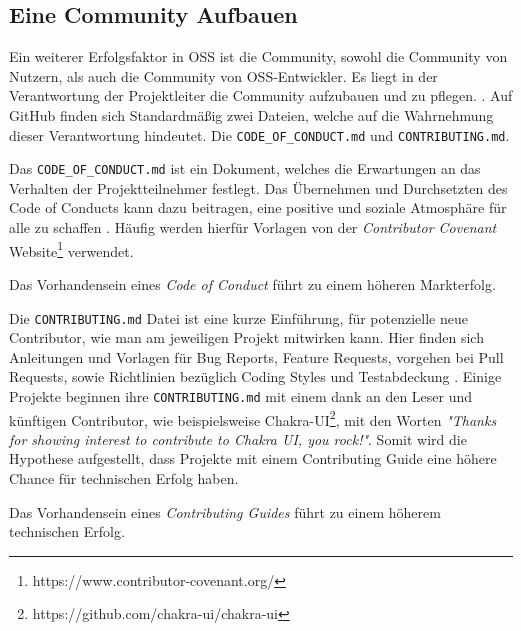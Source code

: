 \subsection{Eine Community Aufbauen} \label{ssec:Eine Community Aufbauen}


Ein weiterer Erfolgsfaktor in OSS ist die Community, sowohl die Community von Nutzern, als auch die
Community von OSS-Entwickler. Es liegt in der Verantwortung der Projektleiter die Community aufzubauen
und zu pflegen. \cite{bangerthWhatMakesComputational2013,GitHubBuildingWelcomingCommunities2022}.
Auf GitHub finden sich Standardmäßig zwei Dateien, welche auf die Wahrnehmung dieser Verantwortung
hindeutet. Die \texttt{CODE\_OF\_CONDUCT.md} und \texttt{CONTRIBUTING.md}.

\bigskip

Das \texttt{CODE\_OF\_CONDUCT.md} ist ein Dokument, welches die Erwartungen an das Verhalten der
Projektteilnehmer festlegt.
Das Übernehmen und Durchsetzten des Code of Conducts kann dazu beitragen, eine positive und soziale
Atmosphäre für alle zu schaffen \cite{GitHubYourCodeOfConduct2022}. %
Häufig werden hierfür Vorlagen von der \textit{Contributor Covenant} 
Website\footnote{https://www.contributor-covenant.org/} verwendet.

\begin{hypothesis}
    Das Vorhandensein eines \textit{Code of Conduct} führt zu einem höheren Markterfolg.
\end{hypothesis}

Die \texttt{CONTRIBUTING.md} Datei ist eine kurze Einführung, für potenzielle neue Contributor,
wie man am jeweiligen Projekt mitwirken kann. Hier finden sich Anleitungen und Vorlagen für 
Bug Reports, Feature Requests, vorgehen bei Pull Requests, sowie Richtlinien bezüglich 
Coding Styles und Testabdeckung \cite{GitHubStartingAProject2022}. %
Einige Projekte beginnen ihre \texttt{CONTRIBUTING.md} mit einem dank an den Leser und künftigen
Contributor, wie beispielsweise Chakra-UI\footnote{https://github.com/chakra-ui/chakra-ui},
mit den Worten 
\textit{"Thanks for showing interest to contribute to Chakra UI, you rock!"}.
Somit wird die Hypothese aufgestellt, dass Projekte mit einem Contributing Guide eine höhere
Chance für technischen Erfolg haben.

\begin{hypothesis}
    Das Vorhandensein eines \textit{Contributing Guides} führt zu einem höherem technischen Erfolg.
\end{hypothesis}
